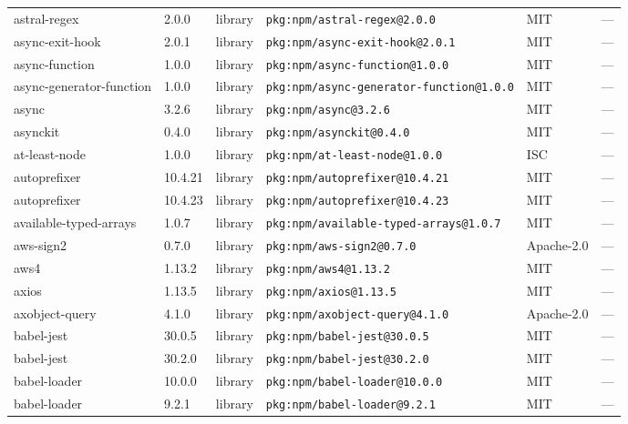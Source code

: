 \documentclass[11pt,a4paper]{article}
\begin{document}
\begin{longtable}{|p{4cm}|p{2cm}|p{1.6cm}|p{5cm}|p{1.5cm}|p{3.5cm}|}
\raggedright astral-regex & 2.0.0 & library & \small\texttt{pkg:npm/astral-regex@2.0.0} & MIT & \small — \\
\raggedright async-exit-hook & 2.0.1 & library & \small\texttt{pkg:npm/async-exit-hook@2.0.1} & MIT & \small — \\
\raggedright async-function & 1.0.0 & library & \small\texttt{pkg:npm/async-function@1.0.0} & MIT & \small — \\
\raggedright async-generator-function & 1.0.0 & library & \small\texttt{pkg:npm/async-generator-function@1.0.0} & MIT & \small — \\
\raggedright async & 3.2.6 & library & \small\texttt{pkg:npm/async@3.2.6} & MIT & \small — \\
\raggedright asynckit & 0.4.0 & library & \small\texttt{pkg:npm/asynckit@0.4.0} & MIT & \small — \\
\raggedright at-least-node & 1.0.0 & library & \small\texttt{pkg:npm/at-least-node@1.0.0} & ISC & \small — \\
\raggedright autoprefixer & 10.4.21 & library & \small\texttt{pkg:npm/autoprefixer@10.4.21} & MIT & \small — \\
\raggedright autoprefixer & 10.4.23 & library & \small\texttt{pkg:npm/autoprefixer@10.4.23} & MIT & \small — \\
\raggedright available-typed-arrays & 1.0.7 & library & \small\texttt{pkg:npm/available-typed-arrays@1.0.7} & MIT & \small — \\
\raggedright aws-sign2 & 0.7.0 & library & \small\texttt{pkg:npm/aws-sign2@0.7.0} & Apache-2.0 & \small — \\
\raggedright aws4 & 1.13.2 & library & \small\texttt{pkg:npm/aws4@1.13.2} & MIT & \small — \\
\raggedright axios & 1.13.5 & library & \small\texttt{pkg:npm/axios@1.13.5} & MIT & \small — \\
\raggedright axobject-query & 4.1.0 & library & \small\texttt{pkg:npm/axobject-query@4.1.0} & Apache-2.0 & \small — \\
\raggedright babel-jest & 30.0.5 & library & \small\texttt{pkg:npm/babel-jest@30.0.5} & MIT & \small — \\
\raggedright babel-jest & 30.2.0 & library & \small\texttt{pkg:npm/babel-jest@30.2.0} & MIT & \small — \\
\raggedright babel-loader & 10.0.0 & library & \small\texttt{pkg:npm/babel-loader@10.0.0} & MIT & \small — \\
\raggedright babel-loader & 9.2.1 & library & \small\texttt{pkg:npm/babel-loader@9.2.1} & MIT & \small — \\

\end{longtable}
\end{document}
